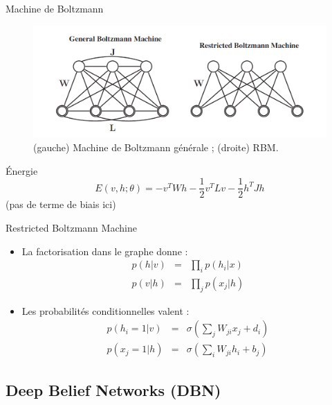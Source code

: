 \begin{frame}{Machine de Boltzmann}
\begin{figure}[ht!]
\centering
\includegraphics[width = \columnwidth]{../fig/boltzmann_machine.png}
\caption{(gauche) Machine de Boltzmann générale ; (droite) RBM.}
\label{fig3}
\end{figure}
\begin{block}{Énergie}
\begin{equation}
E(v,h ; \theta) = -v^TWh - \frac{1}{2}v^TLv - \frac{1}{2}h^T Jh
\end{equation}
(pas de terme de biais ici)
\end{block}
\end{frame}

\begin{frame}{Restricted Boltzmann Machine}
\begin{itemize}
\item La factorisation dans le graphe donne : 
\begin{equation}
\begin{array}{rll}
p(h|v) & = & \displaystyle \prod_{i} p(h_i|x) \\
p(v|h) & = & \displaystyle \prod_{j} p(x_j|h)
\end{array}
\end{equation}

\item Les probabilités conditionnelles valent : 
\begin{equation}
\begin{array}{rll}
p(h_i = 1 |v ) & = & \displaystyle \sigma\left(\sum_j W_{ji}x_j + d_i\right) \\
p(x_j = 1 |h ) & = & \displaystyle \sigma\left(\sum_i W_{ji}h_i + b_j\right)
\end{array}
\end{equation}
\end{itemize}
\end{frame}




\subsection{Deep Belief Networks (DBN)}

